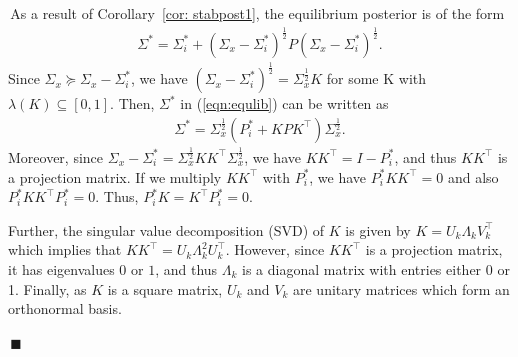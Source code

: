 \documentclass[12pt,journal,onecolumn]{IEEEtran}
\newenvironment{Proof}[1]{\medskip\par\noindent{\bf Proof:\,}\,#1}{{\mbox{\,$\blacksquare$}\par}}
\begin{document}
\begin{Proof}
As a result of Corollary~\ref{cor: stabpost1}, the equilibrium posterior is of the form
\begin{align}\label{eqn:equlib}
    \Sigma^*=\Sigma_i^*+(\Sigma_x-\Sigma_i^*)^{\frac{1}{2}}P(\Sigma_x-\Sigma_i^*)^{\frac{1}{2}}.
\end{align}
Since $\Sigma_x\succeq\Sigma_x-\Sigma^*_i$, we have $(\Sigma_x-\Sigma_i^*)^{\frac{1}{2}} = \Sigma_x^{\frac{1}{2}}K$ for some K with $\lambda(K)\subseteq[0,1]$. Then, $\Sigma^*$ in (\ref{eqn:equlib}) can be written as
\begin{align*}
    \Sigma^*=\Sigma_x^{\frac{1}{2}}(P^*_i+KPK^\top)\Sigma_x^{\frac{1}{2}}.
\end{align*}
Moreover, since $\Sigma_x-\Sigma_i^* =\Sigma_x^{\frac{1}{2}}KK^\top\Sigma_x^{\frac{1}{2}} $, we have $KK^\top = I-P_i^*$, and thus $KK^\top$ is a projection matrix. If we multiply $KK^\top$ with $P_i^*$, we have $P_i^*KK^\top = 0$ and also $P_i^*KK^\top P_i^* =0$. Thus, $P_i^*K=K^\top P_i^*=0$.

Further, the singular value decomposition (SVD) of $K$ is given by $K=U_k\Lambda_kV_k^\top$ which implies that $KK^\top=U_k\Lambda^2_kU_k^\top$. However, since $KK^\top$ is a projection matrix, it has eigenvalues $0$ or $1$, and thus $\Lambda_k$ is a diagonal matrix with entries either 0 or 1. Finally, as $K$ is a square matrix, $U_k$ and $V_k$ are unitary matrices which form an orthonormal basis.


\end{Proof}
\end{document}
